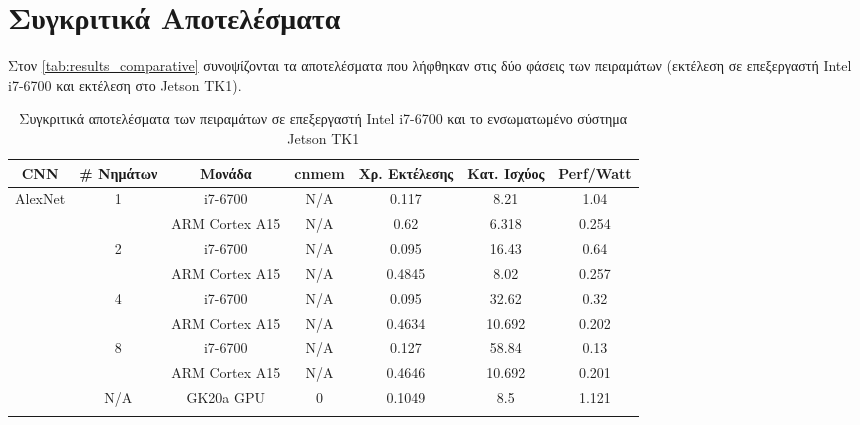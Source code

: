 \section{Συγκριτικά Αποτελέσματα}
\label{sec:experiments_comparative}

Στον \autoref{tab:results_comparative} συνοψίζονται τα αποτελέσματα που λήφθηκαν στις δύο φάσεις
των πειραμάτων (εκτέλεση σε επεξεργαστή Intel i7-6700 και εκτέλεση στο Jetson TK1).

\begin{table}[H]
  \begin{center}
    \caption{Συγκριτικά αποτελέσματα των πειραμάτων σε επεξεργαστή Intel i7-6700 και το ενσωματωμένο σύστημα Jetson TK1}
    \label{tab:results_comparative}
    \footnotesize
    \begin{tabular}[center]{ | c | c | c | c | c | c | c | }
      \hline
      \rowcolor{Gray}
      CNN & \# Nημάτων & Μονάδα & cnmem & Χρ. Eκτέλεσης & Κατ. Ισχύος & Perf/Watt \\
      \hline
      \multirow{10}{*}{AlexNet}   & \multirow{2}{*}{1}    & i7-6700                     & N/A     & 0.117   & 8.21    & 1.04    \\ \cline{3-7}
                                  &                       & ARM Cortex A15              & N/A     & 0.62    & 6.318   & 0.254   \\ \cline{2-7}
                                  & \multirow{2}{*}{2}    & i7-6700                     & N/A     & 0.095   & 16.43   & 0.64    \\ \cline{3-7}
                                  &                       & ARM Cortex A15              & N/A     & 0.4845  & 8.02    & 0.257   \\ \cline{2-7}
                                  & \multirow{2}{*}{4}    & i7-6700                     & N/A     & 0.095   & 32.62   & 0.32    \\ \cline{3-7}
                                  &                       & ARM Cortex A15              & N/A     & 0.4634  & 10.692  & 0.202   \\ \cline{2-7}
                                  & \multirow{2}{*}{8}    & i7-6700                     & N/A     & 0.127   & 58.84   & 0.13    \\ \cline{3-7}
                                  &                       & ARM Cortex A15              & N/A     & 0.4646  & 10.692  & 0.201   \\ \cline{2-7}
                                  & \multirow{2}{*}{N/A}  & \multirow{2}{*}{GK20a GPU}  & 0       & 0.1049  & 8.5     & 1.121   \\ \cline{4-7}

\end{tabular}
\end{center}
\end{table}
